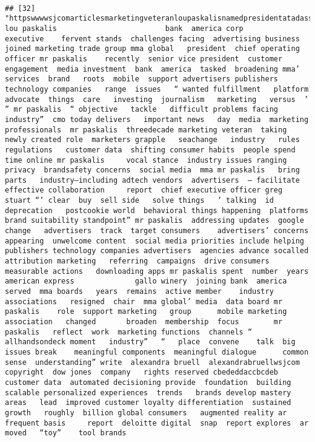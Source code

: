 \documentclass[
]{article}
\begin{document}
\begin{verbatim}
                                                                                                                                                                                                                                                                                                                                                                                                                                                                   
## [32] "httpswwwwsjcomarticlesmarketingveteranloupaskalisnamedpresidentatadassociationmma lou paskalis                         bank  america corp         executive    fervent stands  challenges facing  advertising business  joined marketing trade group mma global   president  chief operating officer mr paskalis    recently  senior vice president  customer engagement  media investment  bank  america  tasked  broadening mma’ services  brand   roots  mobile  support advertisers publishers  technology companies   range  issues   “ wanted fulfillment   platform    advocate  things  care   investing  journalism   marketing   versus  ’ ” mr paskalis  “ objective   tackle   difficult problems facing  industry”  cmo today delivers   important news   day  media  marketing professionals  mr paskalis  threedecade marketing veteran  taking  newly created role  marketers grapple   seachange   industry   rules  regulations   customer data  shifting consumer habits  people spend  time online mr paskalis     vocal stance  industry issues ranging  privacy  brandsafety concerns  social media  mma mr paskalis   bring   parts   industry—including adtech vendors  advertisers  — facilitate  effective collaboration     report  chief executive officer greg stuart “’ clear  buy  sell side   solve things   ’ talking  id deprecation   postcookie world  behavioral things happening  platforms   brand suitability standpoint” mr paskalis  addressing updates  google   change   advertisers  track  target consumers    advertisers’ concerns  appearing  unwelcome content  social media priorities include helping publishers technology companies advertisers  agencies advance socalled attribution marketing   referring  campaigns  drive consumers   measurable actions   downloading apps mr paskalis spent  number  years                        american express              gallo winery  joining bank  america     served  mma boards   years  remains  active member    industry associations   resigned  chair  mma global’ media  data board mr paskalis    role  support marketing   group      mobile marketing association   changed       broaden  membership  focus        mr paskalis   reflect  work  marketing functions  channels “   allhandsondeck moment   industry”   “   place  convene    talk  big issues break    meaningful components  meaningful dialogue      common sense  understanding” write  alexandra bruell  alexandrabruellwsjcom copyright  dow jones  company   rights reserved cbededdaccbcdeb customer data  automated decisioning provide  foundation  building scalable personalized experiences  trends   brands develop mastery   areas   lead  improved customer loyalty differentiation  sustained growth   roughly  billion global consumers   augmented reality ar   frequent basis     report  deloitte digital  snap  report explores  ar  moved   “toy”    tool brands   
\end{verbatim}
\end{document}
